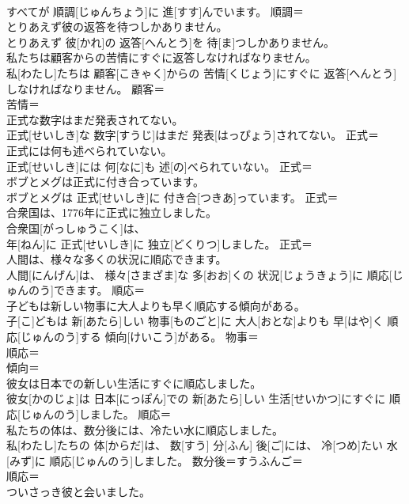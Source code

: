 \documentclass[8pt]{extreport}
\begin{document}
\begin{CJK}{UTF8}{min}
\\	すべてが 順調[じゅんちょう]に 進[すす]んでいます。	順調＝ 
\\	とりあえず彼の返答を待つしかありません。	
\\	とりあえず 彼[かれ]の 返答[へんとう]を 待[ま]つしかありません。	
\\	私たちは顧客からの苦情にすぐに返答しなければなりません。	
\\	私[わたし]たちは 顧客[こきゃく]からの 苦情[くじょう]にすぐに 返答[へんとう]しなければなりません。	顧客＝ 
\\	苦情＝ 
\\	正式な数字はまだ発表されてない。	
\\	正式[せいしき]な 数字[すうじ]はまだ 発表[はっぴょう]されてない。	正式＝ 
\\	正式には何も述べられていない。	
\\	正式[せいしき]には 何[なに]も 述[の]べられていない。	正式＝ 
\\	ボブとメグは正式に付き合っています。	
\\	ボブとメグは 正式[せいしき]に 付き合[つきあ]っています。	正式＝ 
\\	合衆国は、1776年に正式に独立しました。	
\\	合衆国[がっしゅうこく]は、 
\\	年[ねん]に 正式[せいしき]に 独立[どくりつ]しました。	正式＝ 
\\	人間は、様々な多くの状況に順応できます。	
\\	人間[にんげん]は、 様々[さまざま]な 多[おお]くの 状況[じょうきょう]に 順応[じゅんのう]できます。	順応＝ 
\\	子どもは新しい物事に大人よりも早く順応する傾向がある。	
\\	子[こ]どもは 新[あたら]しい 物事[ものごと]に 大人[おとな]よりも 早[はや]く 順応[じゅんのう]する 傾向[けいこう]がある。	物事＝ 
\\	順応＝ 
\\	傾向＝ 
\\	彼女は日本での新しい生活にすぐに順応しました。	
\\	彼女[かのじょ]は 日本[にっぽん]での 新[あたら]しい 生活[せいかつ]にすぐに 順応[じゅんのう]しました。	順応＝ 
\\	私たちの体は、数分後には、冷たい水に順応しました。	
\\	私[わたし]たちの 体[からだ]は、 数[すう] 分[ふん] 後[ご]には、 冷[つめ]たい 水[みず]に 順応[じゅんのう]しました。	数分後＝すうふんご＝ 
\\	順応＝ 
\\	ついさっき彼と会いました。	

\end{CJK}
\end{document}
